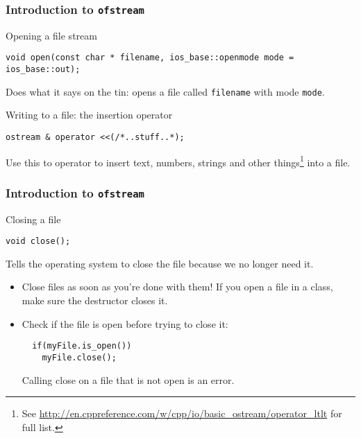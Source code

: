 \documentclass[handout]{beamer}
\begin{document}
\begin{frame}[fragile]
  \frametitle{Introduction to \texttt{ofstream}}
  \begin{block}{Opening a file stream}
  	\begin{lstlisting}[aboveskip=0pt]
  void open(const char * filename, ios_base::openmode mode = ios_base::out);
  	\end{lstlisting}
		Does what it says on the tin: opens a file called \texttt{filename} with mode \texttt{mode}.
  
  \end{block}
  \pause
  \begin{block}{Writing to a file: the insertion operator}
  \begin{lstlisting}[aboveskip=0pt]
  ostream & operator <<(/*..stuff..*);
  \end{lstlisting}
  Use this to operator to insert text, numbers, strings and other things\footnote{See \url{http://en.cppreference.com/w/cpp/io/basic_ostream/operator_ltlt} for full list.} into a file.
  \end{block}
  
\end{frame}

\begin{frame}[fragile]
  \frametitle{Introduction to \texttt{ofstream}}
  
  \begin{block}{Closing a file}
  \begin{lstlisting}[aboveskip=0pt]
  void close();
  \end{lstlisting}
  Tells the operating system to close the file because we no longer need it.
  \end{block}
  \pause
  \begin{doblocke}
    \begin{itemize}
      \item{Close files as soon as you're done with them!  If you open a file in a class, make sure the destructor closes it.}
      \pause
      \item{Check if the file is open before trying to close it:
      \begin{lstlisting}
  if(myFile.is_open())
    myFile.close();
      \end{lstlisting}
      Calling close on a file that is not open is an error.}
    \end{itemize}
  \end{doblocke}
  
\end{frame}
\end{document}
